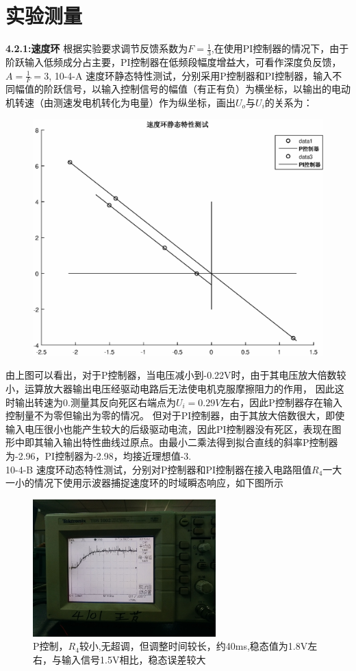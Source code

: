 \documentclass[10.5pt]{ctexart}
\begin{document}
\section{实验测量}
\textbf{4.2.1:速度环}
根据实验要求调节反馈系数为$F=\frac{1}{3}$,在使用PI控制器的情况下，由于阶跃输入低频成分占主要，PI控制器在低频段幅度增益大，可看作深度负反馈，
$A=\frac{1}{F}=3$,
10-4-A 速度环静态特性测试，分别采用P控制器和PI控制器，输入不同幅值的阶跃信号，以输入控制信号的幅值（有正有负）为横坐标，以输出的电动机转速（由测速发电机转化为电量）作为纵坐标，画出$U_{o}$与$U_{i}$的关系为：
\begin{figure}[!ht]
\centering
\includegraphics[width=400pt]{vl_static.eps}
\end{figure}
由上图可以看出，对于P控制器，当电压减小到-0.22V时，由于其电压放大倍数较小，运算放大器输出电压经驱动电路后无法使电机克服摩擦阻力的作用，
因此这时输出转速为0.测量其反向死区右端点为$U_{i}=0.29V$左右，因此P控制器存在输入控制量不为零但输出为零的情况。
但对于PI控制器，由于其放大倍数很大，即使输入电压很小也能产生较大的后级驱动电流，因此PI控制器没有死区，表现在图形中即其输入输出特性曲线过原点。由最小二乘法得到拟合直线的斜率P控制器为-2.96，PI控制器为-2.98，均接近理想值-3.\\
10-4-B 速度环动态特性测试，分别对P控制器和PI控制器在接入电路阻值$R_4$一大一小的情况下使用示波器捕捉速度环的时域瞬态响应，如下图所示
\begin{figure}[!ht]
\centering
\caption{P控制，$R_4$较小,无超调，但调整时间较长，约40ms,稳态值为1.8V左右，与输入信号1.5V相比，稳态误差较大}
\includegraphics[width=200pt]{IMG_20161216_100917.jpg}
\end{figure}
\end{document}

